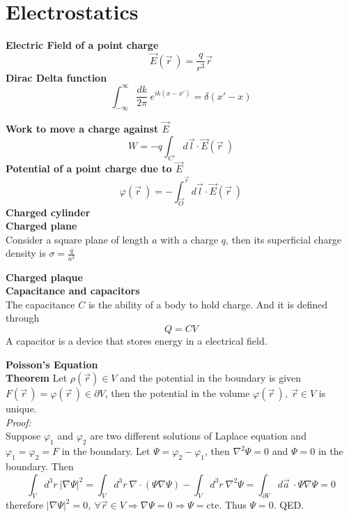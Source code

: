 \documentclass[12pt,a4paper]{article}
\newcommand{\integral}[3]{\int_{#1}^{#2} d #3 \ } %
\begin{document}
\section{Electrostatics}
\textbf{Electric Field of a point charge}\\
\begin{equation}
	\vec{E}(\vec{r}\ ) = \frac{q}{r^3}\vec{r}
\end{equation}
\textbf{Dirac Delta function}\\
\begin{equation}
	\int_{-\infty}^{\infty} \frac{dk}{2\pi} \ e^{ik(x-x')} = \delta (x'-x)
\end{equation}

\textbf{Work to move a charge against $\vec{E}$}\\
\begin{equation}
	W = -q \int_{C'}d\vec{l} \cdot\vec{E}(\vec{r}\ ) 
\end{equation}
\textbf{Potential of a point charge due to $\vec{E}$}\\
\begin{equation}
	\varphi (\vec{r}\ ) = - \int_{\vec{O}}^{\vec{r}} d\vec{l} \cdot\vec{E}(\vec{r}\ ) 
\end{equation}
\textbf{Charged cylinder}\\

\textbf{Charged plane}\\
Consider a square plane of length $a$ with a charge $q$, then its superficial charge density is $\sigma = \frac{q}{a^2}$ 

\textbf{Charged plaque}\\ 

\textbf{Capacitance and capacitors}\\
The capacitance $C$ is the ability of a body to hold charge. And it is defined through
\begin{equation}
	Q= CV
\end{equation}
A capacitor is a device that stores energy in a electrical field.

\textbf{Poisson's Equation}\\

\textbf{Theorem} Let $\rho(\vec{r}) \in V$ and the potential in the boundary is given $F(\vec{r}\,)=\varphi(\vec{r} \,) \in \partial V$, then the potential in the volume $\varphi(\vec{r}\,), \  \vec{r} \in  V$ is unique. \\
\textit{Proof: }\\
Suppose $\varphi_1$ and $\varphi_2$ are two different solutions of Laplace equation and $\varphi_1 = \varphi_2 = F$ in the boundary. Let $\Psi = \varphi_2-\varphi_1$, then $\nabla^2 \Psi = 0$  and  $\Psi = 0$ in the boundary. Then
\begin{equation}
	\integral{V}{}{^3r} |\nabla \Psi|^2 = \integral{V}{}{^3r} \nabla\cdot (\Psi \nabla \Psi)- \integral{V}{}{^3r} \nabla^2 \Psi = \integral{\partial V}{}{ \vec{a}} \cdot \Psi\nabla \Psi = 0
\end{equation}
therefore $|\nabla \Psi|^2 = 0, \  \forall \vec{r} \in V  \Rightarrow \nabla \Psi = 0 \Rightarrow \Psi = \text{cte.}$  Thus $\Psi = 0$. QED.
\end{document}
